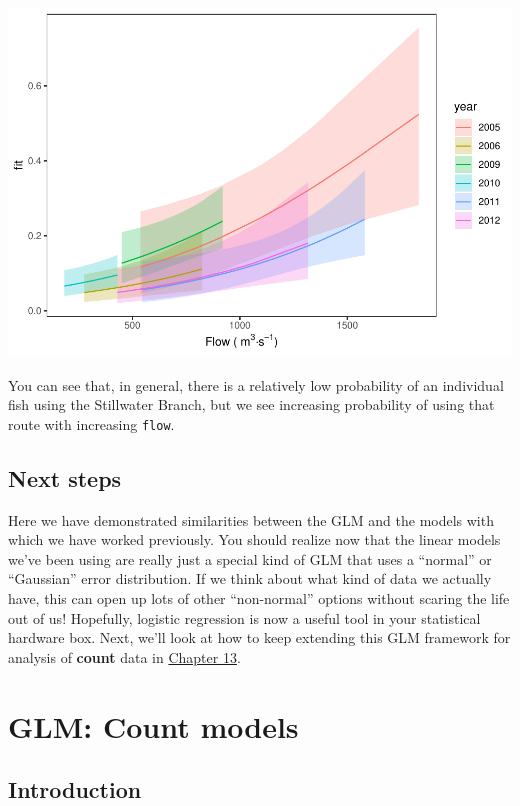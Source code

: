 \documentclass[
]{book}
\begin{document}
\includegraphics{worstr_files/figure-latex/unnamed-chunk-344-1.pdf}

You can see that, in general, there is a relatively low probability of an individual fish using the Stillwater Branch, but we see increasing probability of using that route with increasing \texttt{flow}.

\hypertarget{next12}{%
\section{Next steps}\label{next12}}

Here we have demonstrated similarities between the GLM and the models with which we have worked previously. You should realize now that the linear models we've been using are really just a special kind of GLM that uses a ``normal'' or ``Gaussian'' error distribution. If we think about what kind of data we actually have, this can open up lots of other ``non-normal'' options without scaring the life out of us! Hopefully, logistic regression is now a useful tool in your statistical hardware box. Next, we'll look at how to keep extending this GLM framework for analysis of \textbf{count} data in \protect\hyperlink{Chapter13}{Chapter 13}.

\hypertarget{Chapter13}{%
\chapter{GLM: Count models}\label{Chapter13}}

\hypertarget{intro13}{%
\section{Introduction}\label{intro13}}
\end{document}
